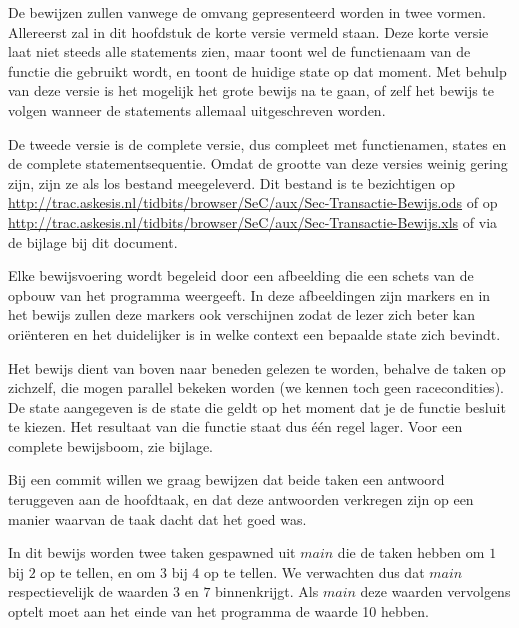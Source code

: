  \nocite{SkeenStonebraker}
De bewijzen zullen vanwege de omvang gepresenteerd worden in twee vormen. Allereerst zal in dit hoofdstuk de korte
versie vermeld staan. Deze korte versie laat niet steeds alle statements zien, maar toont wel de functienaam van de
functie die gebruikt wordt, en toont de huidige state op dat moment. Met behulp van deze versie is het mogelijk het
grote bewijs na te gaan, of zelf het bewijs te volgen wanneer de statements allemaal uitgeschreven worden.

De tweede versie is de complete versie, dus compleet met functienamen, states en de complete statementsequentie. Omdat
de grootte van deze versies weinig gering zijn, zijn ze als los bestand meegeleverd. Dit bestand is te bezichtigen op
\url{http://trac.askesis.nl/tidbits/browser/SeC/aux/Sec-Transactie-Bewijs.ods} of op
\url{http://trac.askesis.nl/tidbits/browser/SeC/aux/Sec-Transactie-Bewijs.xls} of via de bijlage bij dit document.

Elke bewijsvoering wordt begeleid door een afbeelding die een schets van de opbouw van het programma weergeeft. In deze
afbeeldingen zijn markers en in het bewijs zullen deze markers ook verschijnen zodat de lezer zich beter kan ori\"enteren
en het duidelijker is in welke context een bepaalde state zich bevindt.

Het bewijs dient van boven naar beneden gelezen te worden, behalve de taken op zichzelf, die mogen parallel bekeken
worden (we kennen toch geen racecondities). De state aangegeven is de state die geldt op het moment dat je de functie
besluit te kiezen. Het resultaat van die functie staat dus \'e\'en regel lager. Voor een complete bewijsboom, zie
bijlage.

Bij een commit willen we graag bewijzen dat beide taken een antwoord teruggeven aan de hoofdtaak, en dat deze
antwoorden verkregen zijn op een manier waarvan de taak dacht dat het goed was.

In dit bewijs worden twee taken gespawned uit \(main\) die de taken hebben om \(1\) bij \(2\) op te tellen, en om \(3\)
bij \(4\) op te tellen. We verwachten dus dat \(main\) respectievelijk de waarden \(3\) en \(7\) binnenkrijgt. Als
\(main\) deze waarden vervolgens optelt moet aan het einde van het programma  de waarde 10 hebben.

